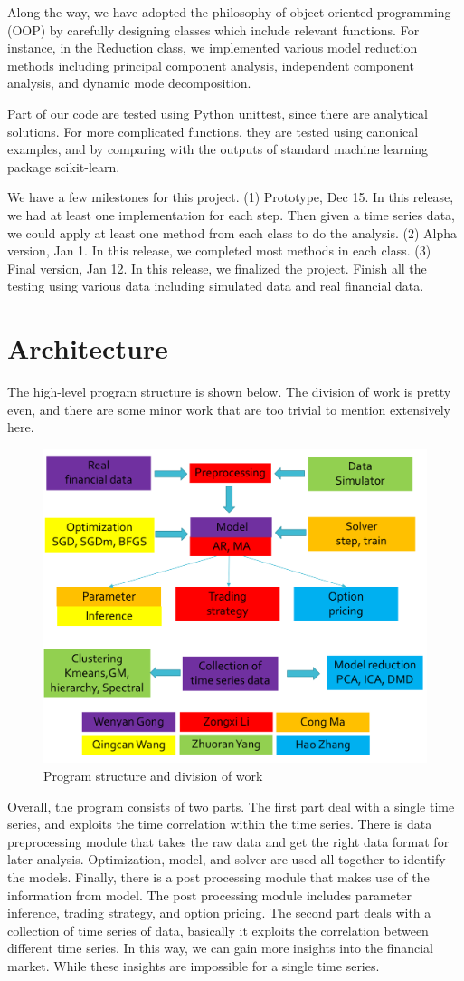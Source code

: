 \documentclass[12pt,a4paper]{article}
\begin{document}
Along the way, we have adopted the philosophy of object oriented programming (OOP) by carefully designing classes which include relevant functions. For instance, in the Reduction class, we implemented various model reduction methods including principal component analysis, independent component analysis, and dynamic mode decomposition.

Part of our code are tested using Python unittest, since there are analytical solutions. For more complicated functions, they are tested using canonical examples, and by comparing with the outputs of standard machine learning package scikit-learn.

We have a few milestones for this project. (1) Prototype, Dec 15. In this release, we had at least one implementation for each step. Then given a time series data, we could apply at least one method from each class to do the analysis. (2) Alpha version, Jan 1. In this release, we completed most methods in each class. (3) Final version, Jan 12.  In this release, we finalized the project. Finish all the testing using various data including simulated data and real financial data.

\section{Architecture}
The high-level program structure is shown below. The division of work is pretty even, and there are some minor work that are too trivial to mention extensively here. 
\begin{figure}[H]
        \centering
     \includegraphics[width=.7\linewidth]{./Figure/structure.png}
\caption{Program structure and division of work}
\end{figure}
Overall, the program consists of two parts. The first part deal with a single time series, and exploits the time correlation within the time series. There is data preprocessing module that takes the raw data and get the right data format for later analysis. Optimization, model, and solver are used all together to identify the models. Finally, there is a post processing module that makes use of the information from model. The post processing module includes parameter inference, trading strategy, and option pricing. The second part deals with a collection of time series of data, basically it exploits the correlation between different time series. In this way, we can gain more insights into the financial market. While these insights are impossible for a single time series.
\end{document}
